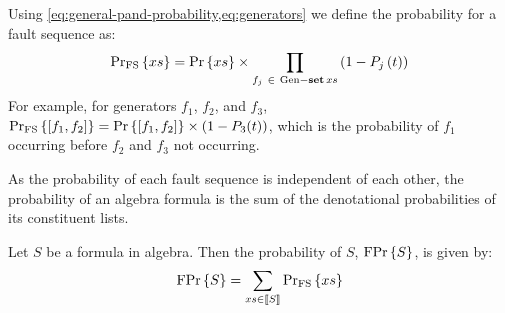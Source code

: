 Using \cref{eq:general-pand-probability,eq:generators} we define the probability for a fault sequence as:
%
\begin{equation}
\mathrm{Pr_{FS}}\left\{xs\right\} = 
  \Pr\left\{xs\right\} \times \prod_{f_j ~\in~ \mathrm{Gen} - \operatorname{\mathbf{set}} xs} \left(1-P_j\left(t\right)\right)\label{eq:denotational-probability}
\end{equation}
%
%
For example, for generators $f_1$, $f_2$, and $f_3$, $\mathrm{Pr_{FS}}\left\{\left[f_1,f_2\right]\right\} = \Pr\left\{\left[f_1,f_2\right]\right\}\times\left(1-P_3(t)\right)$, which is the probability of $f_1$ occurring before $f_2$ and $f_3$ not occurring.

As the probability of each fault sequence is independent of each other, the probability of an \ac{algebra} formula is the sum of the denotational probabilities of its constituent lists.

\begin{definition}
Let $S$ be a formula in \ac{algebra}.
Then the probability of $S$, $\mathrm{FPr}\left\{S\right\}$, is given by:
%
\begin{equation}
\label{eq:formula-probability}
\mathrm{FPr}\left\{S\right\} = \sum_{xs \in \left[\!\left[S\right]\!\right]}\mathrm{Pr_{FS}}\left\{xs\right\}
\end{equation}
\end{definition}

